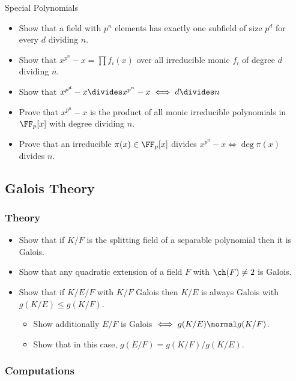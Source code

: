 Special Polynomials

\begin{itemize}
\tightlist
\item
  Show that a field with \(p^n\) elements has exactly one subfield of
  size \(p^d\) for every \(d\) dividing \(n\).
\item
  Show that \(x^{p^n} - x = \prod f_i(x)\) over all irreducible monic
  \(f_i\) of degree \(d\) dividing \(n\).
\item
  Show that \(x^{p^d} - x \divides x^{p^n} - x \iff d \divides n\)
\item
  Prove that \(x^{p^n}-x\) is the product of all monic irreducible
  polynomials in \(\FF_p[x]\) with degree dividing \(n\).
\item
  Prove that an irreducible \(\pi(x)\in \FF_p[x]\) divides
  \(x^{p^n}-x \iff \deg \pi(x)\) divides \(n\).
\end{itemize}

\hypertarget{galois-theory-1}{%
\subsection{Galois Theory}\label{galois-theory-1}}

\hypertarget{theory}{%
\subsubsection{Theory}\label{theory}}

\begin{itemize}
\tightlist
\item
  Show that if \(K/F\) is the splitting field of a separable polynomial
  then it is Galois.
\item
  Show that any quadratic extension of a field \(F\) with
  \(\ch(F)\neq 2\) is Galois.
\item
  Show that if \(K/E/F\) with \(K/F\) Galois then \(K/E\) is always
  Galois with \(g(K/E) \leq g(K/F)\).

  \begin{itemize}
  \tightlist
  \item
    Show additionally \(E/F\) is Galois \(\iff g(K/E) \normal g(K/F)\).
  \item
    Show that in this case, \(g(E/F) = g(K/F) / g(K/E)\).
  \end{itemize}
\end{itemize}

\hypertarget{computations}{%
\subsubsection{Computations}\label{computations}}

